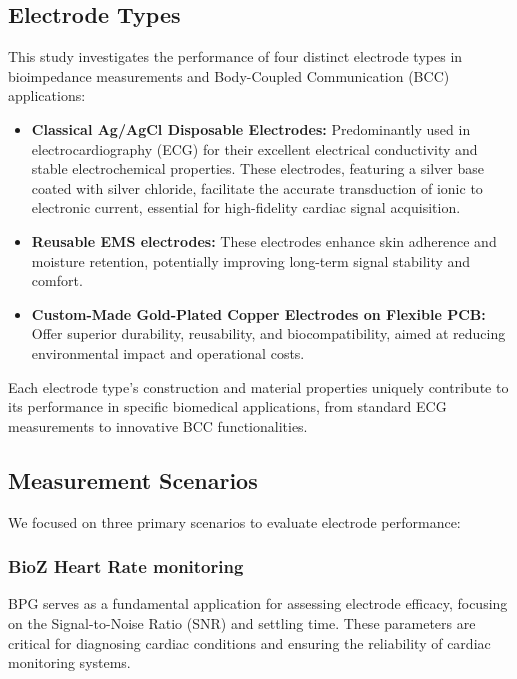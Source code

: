 \documentclass[conference]{IEEEtran}
\newcommand{\notea}[1]{\textcolor{blue}{Armands: #1}}
\begin{document}
\subsection{Electrode Types}
This study investigates the performance of four distinct electrode types in bioimpedance measurements and Body-Coupled Communication (BCC) applications:
\begin{itemize}
    \item \textbf{Classical Ag/AgCl Disposable Electrodes:} Predominantly used in electrocardiography (ECG) for their excellent electrical conductivity and stable electrochemical properties. These electrodes, featuring a silver base coated with silver chloride, facilitate the accurate transduction of ionic to electronic current, essential for high-fidelity cardiac signal acquisition.
    
    \item \textbf{Reusable EMS electrodes:} These electrodes enhance skin adherence and moisture retention, potentially improving long-term signal stability and comfort.
    
    \item \textbf{Custom-Made Gold-Plated Copper Electrodes on Flexible PCB:} Offer superior durability, reusability, and biocompatibility, aimed at reducing environmental impact and operational costs.
    
\end{itemize}

Each electrode type's construction and material properties uniquely contribute to its performance in specific biomedical applications, from standard ECG measurements to innovative BCC functionalities. 


\subsection{Measurement Scenarios}
We focused on three primary scenarios to evaluate electrode performance:

\subsubsection{BioZ Heart Rate monitoring}
BPG serves as a fundamental application for assessing electrode efficacy, focusing on the Signal-to-Noise Ratio (SNR) and settling time. These parameters are critical for diagnosing cardiac conditions and ensuring the reliability of cardiac monitoring systems.
\end{document}
